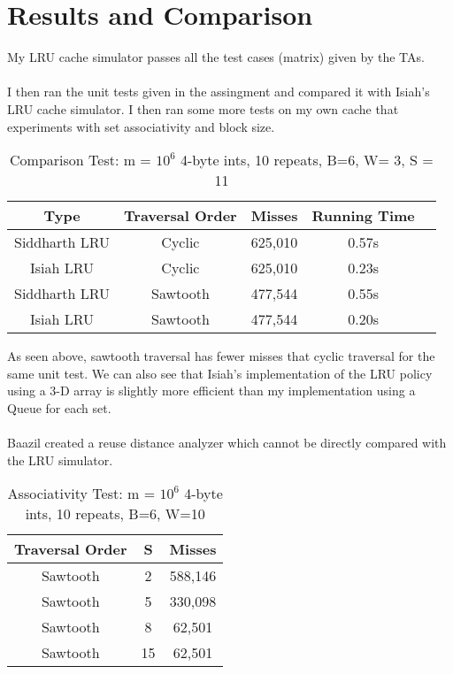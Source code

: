 \documentclass{article}
\begin{document}
\section{Results and Comparison}

My LRU cache simulator passes all the test cases (matrix) given by the TAs.
\\ \\
I then ran the unit tests given in the assingment and compared it with Isiah's LRU cache simulator. I then ran some more tests on my own cache that experiments with set associativity and block size. 

\begin{table}[htbp]
\centering
\captionsetup{labelformat=empty}
\caption{Comparison Test: m = $10^6$ 4-byte ints, 10 repeats, B=6, W= 3, S = 11}
\begin{tabular}{|c|c|c|c|c|}
\hline
Type & Traversal Order & Misses & Running Time \\
\hline
Siddharth LRU & Cyclic & 625,010 & 0.57s \\
\hline
Isiah LRU & Cyclic & 625,010 & 0.23s \\
\hline
Siddharth LRU & Sawtooth & 477,544 & 0.55s \\
\hline
Isiah LRU & Sawtooth & 477,544 & 0.20s \\
\hline
\end{tabular}
\end{table}

\noindent As seen above, sawtooth traversal has fewer misses that cyclic traversal for the same unit test. We can also see that Isiah's implementation of the LRU policy using a 3-D array is slightly more efficient than my implementation using a Queue for each set. 
\\ \\
Baazil created a reuse distance analyzer which cannot be directly compared with the LRU simulator. 

\begin{table}[H]
\centering
\captionsetup{labelformat=empty}
\caption{Associativity Test: m = $10^6$ 4-byte ints, 10 repeats, B=6, W=10}
\begin{tabular}{|c|c|c|}
\hline
Traversal Order & S & Misses  \\
\hline
Sawtooth & 2 & 588,146 \\
\hline
Sawtooth & 5 & 330,098 \\
\hline
Sawtooth & 8 & 62,501 \\
\hline
Sawtooth & 15 & 62,501 \\
\hline
\end{tabular}
\end{table}
\end{document}
